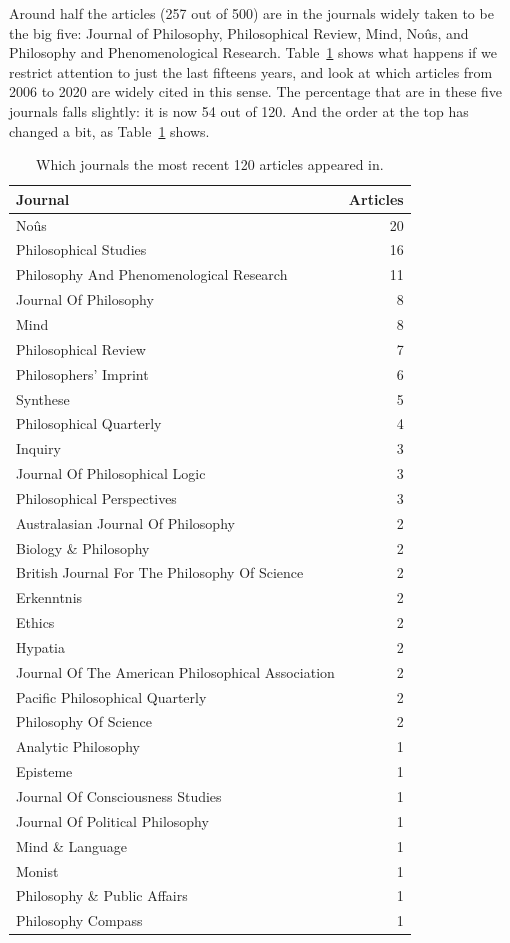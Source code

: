 \documentclass[
  10pt,
  letterpaper,
  DIV=11,
  numbers=noendperiod,
  twoside]{scrartcl}
\begin{document}
Around half the articles (257 out of 500) are in the journals widely
taken to be the big five: Journal of Philosophy, Philosophical Review,
Mind, Noûs, and Philosophy and Phenomenological Research.
Table~\ref{tbl-recent-journals-in-main-bib} shows what happens if we
restrict attention to just the last fifteens years, and look at which
articles from 2006 to 2020 are widely cited in this sense. The
percentage that are in these five journals falls slightly: it is now 54
out of 120. And the order at the top has changed a bit, as
Table~\ref{tbl-recent-journals-in-main-bib} shows.

\begin{longtable}[]{@{}lr@{}}

\caption{\label{tbl-recent-journals-in-main-bib}Which journals the most
recent 120 articles appeared in.}

\tabularnewline

\toprule\noalign{}
Journal & Articles \\
\midrule\noalign{}
\endhead
\bottomrule\noalign{}
\endlastfoot
Noûs & 20 \\
Philosophical Studies & 16 \\
Philosophy And Phenomenological Research & 11 \\
Journal Of Philosophy & 8 \\
Mind & 8 \\
Philosophical Review & 7 \\
Philosophers' Imprint & 6 \\
Synthese & 5 \\
Philosophical Quarterly & 4 \\
Inquiry & 3 \\
Journal Of Philosophical Logic & 3 \\
Philosophical Perspectives & 3 \\
Australasian Journal Of Philosophy & 2 \\
Biology \& Philosophy & 2 \\
British Journal For The Philosophy Of Science & 2 \\
Erkenntnis & 2 \\
Ethics & 2 \\
Hypatia & 2 \\
Journal Of The American Philosophical Association & 2 \\
Pacific Philosophical Quarterly & 2 \\
Philosophy Of Science & 2 \\
Analytic Philosophy & 1 \\
Episteme & 1 \\
Journal Of Consciousness Studies & 1 \\
Journal Of Political Philosophy & 1 \\
Mind \& Language & 1 \\
Monist & 1 \\
Philosophy \& Public Affairs & 1 \\
Philosophy Compass & 1 \\

\end{longtable}
\end{document}
